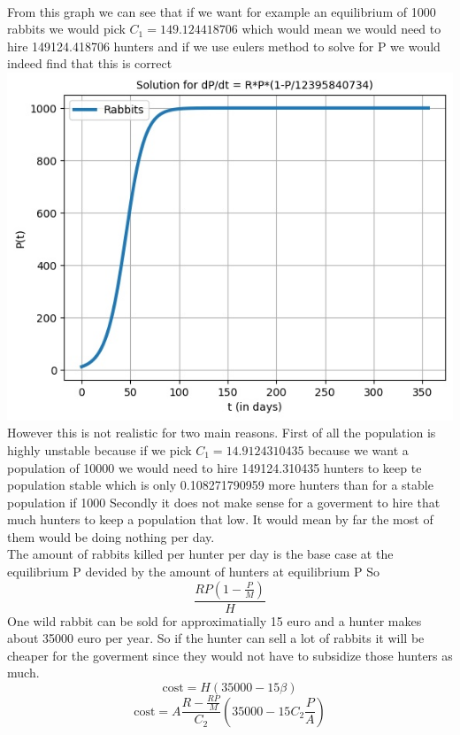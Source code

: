 \documentclass{article}
\begin{document}
\\
From this graph we can see that if we want for example an equilibrium of 1000 rabbits we would pick $C_1 = 149.124418706$ which would mean we would need to hire 149124.418706 hunters and if we use eulers method to solve for P we would indeed find that this is correct
\\
\includegraphics[scale=0.5]{Pictures/1000H}
\\
However this is not realistic for two main reasons. First of all the population is highly unstable because if we pick $C_1 = 14.9124310435$ because we want a population of 10000 we would need to hire 149124.310435 hunters to keep te population stable which is only 0.108271790959 more hunters than for a stable population if 1000 Secondly it does not make sense for a goverment to hire that much hunters to keep a population that low. It would mean by far the most of them would be doing nothing per day.
\\
The amount of rabbits killed per hunter per day is the base case at the equilibrium P devided by the amount of hunters at equilibrium P So
$$\frac{RP(1-\frac{P}{M})}{H}$$
One wild rabbit can be sold for approximatially 15 euro and a hunter makes about 35000 euro per year. So if the hunter can sell a lot of rabbits it will be cheaper for the goverment since they would not have to subsidize those hunters as much. 
$$\text{cost} = H(35000 -15\beta) $$
$$\text{cost} = A\frac{R-\frac{RP}{M}}{C_2}(35000  -15C_2 \frac{P}{A}) $$
\\
\end{document}
